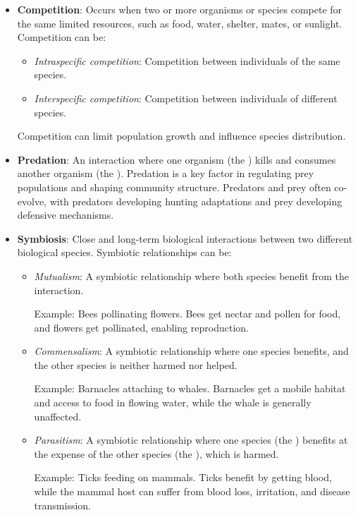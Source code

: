 \begin{itemize}
    \item \textbf{Competition}:  Occurs when two or more organisms or species compete for the same limited resources, such as food, water, shelter, mates, or sunlight. Competition can be:
        \begin{itemize}
            \item \textit{Intraspecific competition}: Competition between individuals of the same species.
            \item \textit{Interspecific competition}: Competition between individuals of different species.
        \end{itemize}
        Competition can limit population growth and influence species distribution.

    \item \textbf{Predation}:  An interaction where one organism (the ) kills and consumes another organism (the ). Predation is a key factor in regulating prey populations and shaping community structure. Predators and prey often co-evolve, with predators developing hunting adaptations and prey developing defensive mechanisms.

    \item \textbf{Symbiosis}:  Close and long-term biological interactions between two different biological species.  Symbiotic relationships can be:
        \begin{itemize}
            \item \textit{Mutualism}:  A symbiotic relationship where both species benefit from the interaction.  \begin{example} Example:  Bees pollinating flowers. Bees get nectar and pollen for food, and flowers get pollinated, enabling reproduction.\end{example}
            \item \textit{Commensalism}: A symbiotic relationship where one species benefits, and the other species is neither harmed nor helped. \begin{example} Example: Barnacles attaching to whales. Barnacles get a mobile habitat and access to food in flowing water, while the whale is generally unaffected.\end{example}
            \item \textit{Parasitism}: A symbiotic relationship where one species (the ) benefits at the expense of the other species (the ), which is harmed. \begin{example} Example:  Ticks feeding on mammals. Ticks benefit by getting blood, while the mammal host can suffer from blood loss, irritation, and disease transmission.\end{example}
        \end{itemize}
\end{itemize}

